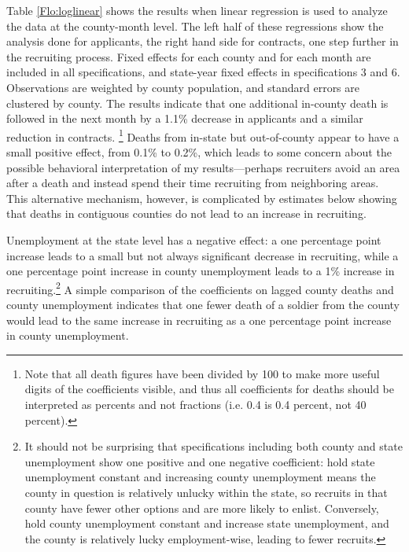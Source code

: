 \documentclass[12pt] {article}
\begin{document}
Table \ref{Flo:loglinear}
shows the results when linear regression is used to analyze the data
at the county-month level. The left half of these regressions show the analysis done for applicants, the right hand side for contracts, one step further in the recruiting
process. %
Fixed effects for each county and for each month are included in all specifications, and state-year fixed effects  in specifications 3 and 6.
Observations are weighted by county population, and standard errors
are clustered by county. The results indicate that one additional
in-county death is followed in the next month by a 1.1\%
decrease in applicants and a similar reduction in contracts.
\footnote{Note that all death figures have been divided by 100 to make more
useful digits of the coefficients visible, and thus all coefficients
for deaths should be interpreted as percents and not fractions (i.e.
0.4 is 0.4 percent, not 40 percent).} Deaths from in-state but out-of-county
appear to have a small positive effect, from 0.1\% to 0.2\%, which leads to some concern about the possible behavioral interpretation of my results---perhaps recruiters avoid an area after a death and instead spend their time recruiting from neighboring areas. This alternative mechanism, however, is complicated by estimates below showing that deaths in contiguous counties do not lead to an increase in recruiting. 

Unemployment at the state level has a negative effect: a one percentage point increase leads to a small but not always significant decrease in recruiting,
while a one percentage point increase in county unemployment leads
to a 1\% increase in recruiting.\footnote{It should not be surprising that specifications including both county and state unemployment show one positive and one negative coefficient: hold state unemployment constant and increasing county unemployment means the county in question is relatively unlucky within the state, so recruits in that county have fewer other options and are more likely to enlist. Conversely, hold county unemployment constant and increase state unemployment, and the county is relatively lucky employment-wise, leading to fewer recruits.}  A simple comparison of the coefficients on lagged county deaths and county unemployment indicates that one fewer death of a soldier from the county would lead to the same increase in recruiting as a one percentage point increase in county unemployment.
\end{document}
